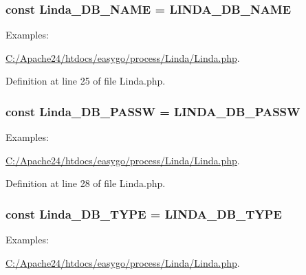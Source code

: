 \subsubsection[{Linda\+\_\+\+D\+B\+\_\+\+N\+A\+M\+E}]{\setlength{\rightskip}{0pt plus 5cm}const Linda\+\_\+\+D\+B\+\_\+\+N\+A\+M\+E = {\bf L\+I\+N\+D\+A\+\_\+\+D\+B\+\_\+\+N\+A\+M\+E}}\label{class_linda_aab80e54270eaebb370e54ec5232be43a}
\begin{Desc}
\item[Examples\+: ]\par
\hyperlink{_c_1_2_apache24_2htdocs_2easygo_2process_2_linda_2_linda_8php-example}{C\+:/\+Apache24/htdocs/easygo/process/\+Linda/\+Linda.\+php}.\end{Desc}


Definition at line 25 of file Linda.\+php.

\hypertarget{class_linda_a392451b719cb6bb9b0c372832ad9e6d8}{}
\subsubsection[{Linda\+\_\+\+D\+B\+\_\+\+P\+A\+S\+S\+W}]{\setlength{\rightskip}{0pt plus 5cm}const Linda\+\_\+\+D\+B\+\_\+\+P\+A\+S\+S\+W = {\bf L\+I\+N\+D\+A\+\_\+\+D\+B\+\_\+\+P\+A\+S\+S\+W}}\label{class_linda_a392451b719cb6bb9b0c372832ad9e6d8}
\begin{Desc}
\item[Examples\+: ]\par
\hyperlink{_c_1_2_apache24_2htdocs_2easygo_2process_2_linda_2_linda_8php-example}{C\+:/\+Apache24/htdocs/easygo/process/\+Linda/\+Linda.\+php}.\end{Desc}


Definition at line 28 of file Linda.\+php.

\hypertarget{class_linda_af392abe38a40b56515eb835fa3c39d8c}{}
\subsubsection[{Linda\+\_\+\+D\+B\+\_\+\+T\+Y\+P\+E}]{\setlength{\rightskip}{0pt plus 5cm}const Linda\+\_\+\+D\+B\+\_\+\+T\+Y\+P\+E = {\bf L\+I\+N\+D\+A\+\_\+\+D\+B\+\_\+\+T\+Y\+P\+E}}\label{class_linda_af392abe38a40b56515eb835fa3c39d8c}
\begin{Desc}
\item[Examples\+: ]\par
\hyperlink{_c_1_2_apache24_2htdocs_2easygo_2process_2_linda_2_linda_8php-example}{C\+:/\+Apache24/htdocs/easygo/process/\+Linda/\+Linda.\+php}.\end{Desc}


